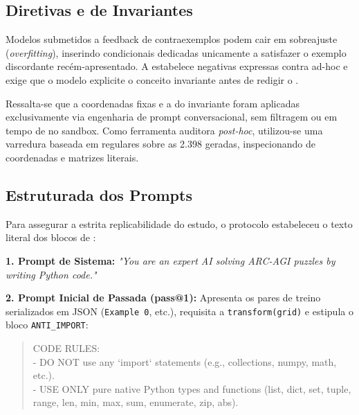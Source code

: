 \documentclass[letterpaper]{article} %
\begin{document}
\subsection{Diretivas \AntiTrapaca{} e \Elicitacao{} de Invariantes}
Modelos submetidos a feedback de contraexemplos podem cair em sobreajuste (\textit{overfitting}), inserindo \clausulas{} condicionais dedicadas unicamente a satisfazer o exemplo discordante rec{\'{e}}m-apresentado. A \estrategia{} \AntiTrapaca{} estabelece \instrucoes{} negativas expressas contra \ramificacoes{} ad-hoc e exige que o modelo explicite o conceito invariante antes de redigir o \codigo{}.

Ressalta-se que a \restricao{} \a{} coordenadas fixas e a \exigencia{} do invariante foram aplicadas exclusivamente via engenharia de prompt conversacional, sem filtragem ou \rejeicao{} \programatica{} em tempo de \execucao{} no sandbox. Como ferramenta auditora \textit{post-hoc}, utilizou-se uma varredura baseada em \expressoes{} regulares sobre as 2.398 \funcoes{} geradas, inspecionando \padroes{} de coordenadas e matrizes literais.

\subsection{\Especificacao{} Estruturada dos Prompts}
Para assegurar a estrita replicabilidade do estudo, o protocolo estabeleceu o texto literal dos blocos de \instrucao{}:

\noindent\textbf{1. Prompt de Sistema:} \textit{"You are an expert AI solving ARC-AGI puzzles by writing Python code."}

\noindent\textbf{2. Prompt Inicial de Passada \Unica{} (pass@1):}
Apresenta os pares de treino serializados em JSON (\texttt{Example 0}, etc.), requisita a \funcao{} \texttt{transform(grid)} e estipula o bloco \texttt{ANTI\_IMPORT}:
\begin{quote}\footnotesize\ttfamily\raggedright\setlength{\topsep}{1.5pt}\setlength{\partopsep}{0pt}
CODE RULES:\\
- DO NOT use any `import` statements (e.g., collections, numpy, math, etc.).\\
- USE ONLY pure native Python types and functions (list, dict, set, tuple, range, len, min, max, sum, enumerate, zip, abs).
\end{quote}
\end{document}
